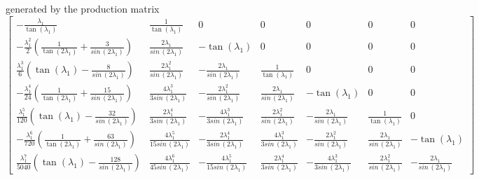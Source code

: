 generated by the production matrix
\begin{displaymath}
\left[\begin{matrix}- \frac{\lambda_{1}}{\tan{\left (\lambda_{1} \right )}} & \frac{1}{\tan{\left (\lambda_{1} \right )}} & 0 & 0 & 0 & 0 & 0\\- \frac{\lambda_{1}^{2}}{2} \left(\frac{1}{\tan{\left (2 \lambda_{1} \right )}} + \frac{3}{sin\,{\left (2 \lambda_{1} \right )}}\right) & \frac{2 \lambda_{1}}{sin\,{\left (2 \lambda_{1} \right )}} & - \tan{\left (\lambda_{1} \right )} & 0 & 0 & 0 & 0\\\frac{\lambda_{1}^{3}}{6} \left(\tan{\left (\lambda_{1} \right )} - \frac{8}{sin\,{\left (2 \lambda_{1} \right )}}\right) & \frac{2 \lambda_{1}^{2}}{sin\,{\left (2 \lambda_{1} \right )}} & - \frac{2 \lambda_{1}}{sin\,{\left (2 \lambda_{1} \right )}} & \frac{1}{\tan{\left (\lambda_{1} \right )}} & 0 & 0 & 0\\- \frac{\lambda_{1}^{4}}{24} \left(\frac{1}{\tan{\left (2 \lambda_{1} \right )}} + \frac{15}{sin\,{\left (2 \lambda_{1} \right )}}\right) & \frac{4 \lambda_{1}^{3}}{3 sin\,{\left (2 \lambda_{1} \right )}} & - \frac{2 \lambda_{1}^{2}}{sin\,{\left (2 \lambda_{1} \right )}} & \frac{2 \lambda_{1}}{sin\,{\left (2 \lambda_{1} \right )}} & - \tan{\left (\lambda_{1} \right )} & 0 & 0\\\frac{\lambda_{1}^{5}}{120} \left(\tan{\left (\lambda_{1} \right )} - \frac{32}{sin\,{\left (2 \lambda_{1} \right )}}\right) & \frac{2 \lambda_{1}^{4}}{3 sin\,{\left (2 \lambda_{1} \right )}} & - \frac{4 \lambda_{1}^{3}}{3 sin\,{\left (2 \lambda_{1} \right )}} & \frac{2 \lambda_{1}^{2}}{sin\,{\left (2 \lambda_{1} \right )}} & - \frac{2 \lambda_{1}}{sin\,{\left (2 \lambda_{1} \right )}} & \frac{1}{\tan{\left (\lambda_{1} \right )}} & 0\\- \frac{\lambda_{1}^{6}}{720} \left(\frac{1}{\tan{\left (2 \lambda_{1} \right )}} + \frac{63}{sin\,{\left (2 \lambda_{1} \right )}}\right) & \frac{4 \lambda_{1}^{5}}{15 sin\,{\left (2 \lambda_{1} \right )}} & - \frac{2 \lambda_{1}^{4}}{3 sin\,{\left (2 \lambda_{1} \right )}} & \frac{4 \lambda_{1}^{3}}{3 sin\,{\left (2 \lambda_{1} \right )}} & - \frac{2 \lambda_{1}^{2}}{sin\,{\left (2 \lambda_{1} \right )}} & \frac{2 \lambda_{1}}{sin\,{\left (2 \lambda_{1} \right )}} & - \tan{\left (\lambda_{1} \right )}\\\frac{\lambda_{1}^{7}}{5040} \left(\tan{\left (\lambda_{1} \right )} - \frac{128}{sin\,{\left (2 \lambda_{1} \right )}}\right) & \frac{4 \lambda_{1}^{6}}{45 sin\,{\left (2 \lambda_{1} \right )}} & - \frac{4 \lambda_{1}^{5}}{15 sin\,{\left (2 \lambda_{1} \right )}} & \frac{2 \lambda_{1}^{4}}{3 sin\,{\left (2 \lambda_{1} \right )}} & - \frac{4 \lambda_{1}^{3}}{3 sin\,{\left (2 \lambda_{1} \right )}} & \frac{2 \lambda_{1}^{2}}{sin\,{\left (2 \lambda_{1} \right )}} & - \frac{2 \lambda_{1}}{sin\,{\left (2 \lambda_{1} \right )}}\end{matrix}\right]
\end{displaymath}

